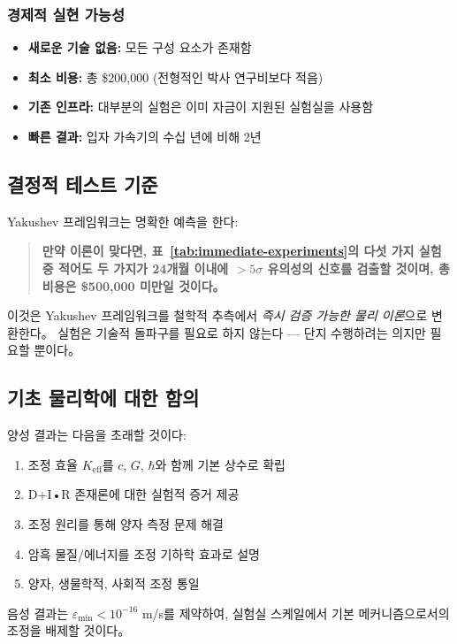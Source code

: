 \documentclass[11pt,a4paper]{article}
\begin{document}
\subsubsection{경제적 실현 가능성}
\begin{itemize}
\item \textbf{새로운 기술 없음:} 모든 구성 요소가 존재함
\item \textbf{최소 비용:} 총 \$200,000 (전형적인 박사 연구비보다 적음)
\item \textbf{기존 인프라:} 대부분의 실험은 이미 자금이 지원된 실험실을 사용함
\item \textbf{빠른 결과:} 입자 가속기의 수십 년에 비해 2년
\end{itemize}

\subsection{결정적 테스트 기준}

Yakushev 프레임워크는 명확한 예측을 한다:

\begin{quote}
\textbf{만약 이론이 맞다면, 표~\ref{tab:immediate-experiments}의 다섯 가지 실험 중 적어도 두 가지가 24개월 이내에 $>5\sigma$ 유의성의 신호를 검출할 것이며, 총 비용은 \$500,000 미만일 것이다。}
\end{quote}

이것은 Yakushev 프레임워크를 철학적 추측에서 \emph{즉시 검증 가능한 물리 이론}으로 변환한다。 실험은 기술적 돌파구를 필요로 하지 않는다 — 단지 수행하려는 의지만 필요할 뿐이다。

\subsection{기초 물리학에 대한 함의}

양성 결과는 다음을 초래할 것이다:
\begin{enumerate}
\item 조정 효율 $K_{\mathrm{eff}}$를 $c$, $G$, $\hbar$와 함께 기본 상수로 확립
\item D+I•R 존재론에 대한 실험적 증거 제공
\item 조정 원리를 통해 양자 측정 문제 해결
\item 암흑 물질/에너지를 조정 기하학 효과로 설명
\item 양자, 생물학적, 사회적 조정 통일
\end{enumerate}

음성 결과는 $\varepsilon_{\min} < 10^{-16}$ m/s를 제약하여, 실험실 스케일에서 기본 메커니즘으로서의 조정을 배제할 것이다。
\end{document}
